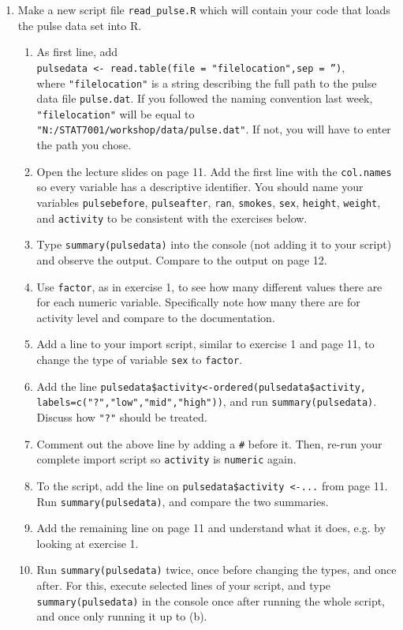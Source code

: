 \begin{enumerate}
\item Make a new script file \texttt{read\_pulse.R} which will contain your code that loads the pulse data set into R.
\begin{enumerate}
\item As first line, add\\ 
    \texttt{pulsedata <- read.table(file = "filelocation",sep = '')},\\ 
    where \texttt{"filelocation"} is a string describing the full path to the pulse data file \texttt{pulse.dat}. If you followed the naming convention last week, \texttt{"filelocation"} will be equal to
    \texttt{"N:/STAT7001/workshop/data/pulse.dat"}. If not, you will have to enter the path you chose.    
\item Open the lecture slides on page 11. Add the first line with the \texttt{col.names} so every variable has a descriptive identifier. You should name your variables \texttt{pulsebefore}, \texttt{pulseafter}, \texttt{ran}, \texttt{smokes}, \texttt{sex}, \texttt{height}, \texttt{weight}, and \texttt{activity} to be consistent with the exercises below.
\item Type \texttt{summary(pulsedata)} into the console (not adding it to your script) and observe the output. Compare to the output on page 12.
\item Use \texttt{factor}, as in exercise 1, to see how many different values there are for each numeric variable. Specifically note how many there are for activity level and compare to the documentation.
\item Add a line to your import script, similar to exercise 1 and page 11, to change the type of variable \texttt{sex} to \texttt{factor}.
\item Add the line
  \texttt{pulsedata\$activity<-ordered(pulsedata\$activity,\\
   labels=c("?","low","mid","high"))}, and run \texttt{summary(pulsedata)}. Discuss how \texttt{"?"} should be treated.
\item Comment out the above line by adding a \texttt{\#} before it. Then, re-run your complete import script so \texttt{activity} is \texttt{numeric} again.
\item To the script, add the line on \texttt{pulsedata\$activity <-...} from page 11. Run \texttt{summary(pulsedata)}, and compare the two summaries.
\item Add the remaining line on page 11 and understand what it does, e.g. by looking at exercise 1.
\item Run \texttt{summary(pulsedata)} twice, once before changing the types, and once after. For this, execute selected lines of your script, and type \texttt{summary(pulsedata)} in the console once after running the whole script, and once only running it up to (b).

\end{enumerate}
\end{enumerate}
